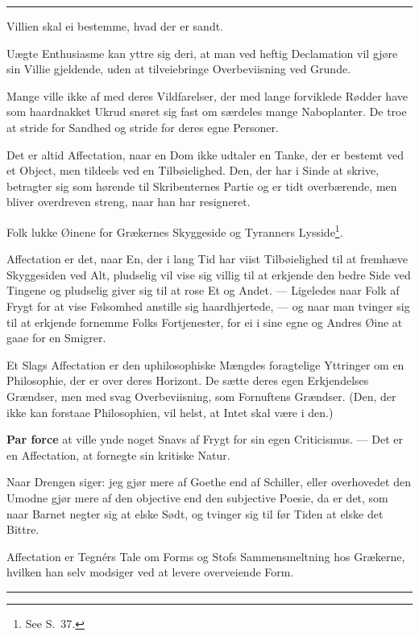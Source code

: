 \documentclass[12pt]{article}
\newcommand{\opage}[1]{\marginnote{\footnotesize\textit{[#1]}}}
\newcommand{\ombreak}{\par\medskip\begin{center}\rule{0.32\textwidth}{0.4pt}\end{center}\medskip}
\begin{document}
\ombreak

Villien skal ei bestemme, hvad der er sandt.

Uægte Enthusiasme kan yttre sig deri, at man ved heftig Declamation vil gjøre sin Villie gjeldende, uden at tilveiebringe Overbeviisning ved Grunde.

Mange ville ikke af med deres Vildfarelser, der med lange forviklede Rødder have som haardnakket Ukrud snøret sig fast om særdeles mange Naboplanter. De troe at stride for Sandhed og stride for deres egne Personer.

Det er altid Affectation, naar en Dom ikke udtaler en Tanke, der er bestemt ved et Object, men tildeels ved en Tilbøielighed. Den, der har i Sinde at skrive, betragter sig som hørende til Skribenternes Partie og er tidt overbærende, men bliver overdreven streng, naar han har resigneret.

Folk lukke Øinene for Grækernes Skyggeside og Tyranners Lysside\footnote{See S.\ 37.}.

Affectation er det, naar En, der i lang Tid har viist Tilbøielighed til at fremhæve Skyggesiden ved Alt, pludselig vil vise sig villig til at erkjende den bedre Side ved Tingene og pludselig giver sig til at rose Et og Andet. --- Ligeledes naar Folk af Frygt for at vise Følsomhed anstille sig haardhjertede, --- og \opage{184}naar man tvinger sig til at erkjende fornemme Folks Fortjenester, for ei i sine egne og Andres Øine at gaae for en Smigrer.

Et Slags Affectation er den uphilosophiske Mængdes foragtelige Yttringer om en Philosophie, der er over deres Horizont. De sætte deres egen Erkjendelses Grændser, men med svag Overbeviisning, som Fornuftens Grændser. (Den, der ikke kan forstaae Philosophien, vil helst, at Intet skal være i den.)

\textbf{Par force} at ville ynde noget Snavs af Frygt for sin egen Criticismus. --- Det er en Affectation, at fornegte sin kritiske Natur.

Naar Drengen siger: jeg gjør mere af Goethe end af Schiller, eller overhovedet den Umodne gjør mere af den objective end den subjective Poesie, da er det, som naar Barnet negter sig at elske Sødt, og tvinger sig til før Tiden at elske det Bittre.

Affectation er Tegnérs Tale om Forms og Stofs Sammensmeltning hos Grækerne, hvilken han selv modsiger ved at levere overveiende Form.

\ombreak
\end{document}
